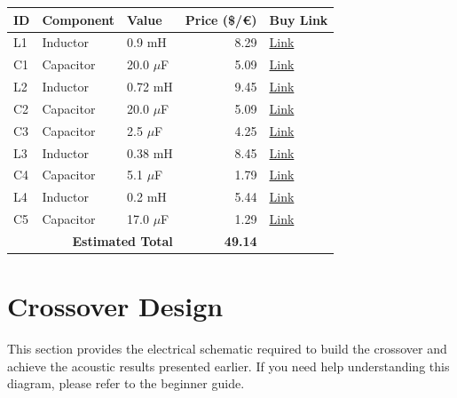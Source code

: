\documentclass[11pt,a4paper]{report}
\begin{document}
\vspace{0.5cm}
\begin{table}[H]
    \centering
    \renewcommand{\arraystretch}{1.5}
    \begin{tabular}{@{}lllrl@{}}
        \toprule
        \textbf{ID} & \textbf{Component} & \textbf{Value} & \textbf{Price (\$/€)} & \textbf{Buy Link} \\
        \midrule
        L1 & Inductor & 0.9 mH & 8.29 & \href{https://www.parts-express.com/Dayton-Audio-LW18-90-0.90mH-18-AWG-Perfect-Layer-Inductor-257-824}{Link} \\
        C1 & Capacitor & 20.0 $\mu$F & 5.09 & \href{https://www.parts-express.com/Solen-20uF-400V-Polypropylene-Capacitor-027-582}{Link} \\
        L2 & Inductor & 0.72 mH & 9.45 & \href{https://www.soundimports.eu/en/jantzen-audio-000-5820.html}{Link} \\
        C2 & Capacitor & 20.0 $\mu$F & 5.09 & \href{https://www.parts-express.com/Solen-20uF-400V-Polypropylene-Capacitor-027-582}{Link} \\
        C3 & Capacitor & 2.5 $\mu$F & 4.25 & \href{https://www.soundimports.eu/en/audyn-q4-2-5-400.html}{Link} \\
        L3 & Inductor & 0.38 mH & 8.45 & \href{https://www.soundimports.eu/en/jantzen-audio-000-1837.html}{Link} \\
        C4 & Capacitor & 5.1 $\mu$F & 1.79 & \href{https://www.parts-express.com/Solen-5.1uF-400V-Polypropylene-Capacitor-027-554}{Link} \\
        L4 & Inductor & 0.2 mH & 5.44 & \href{https://www.soundimports.eu/en/dayton-audio-lw18-20.html}{Link} \\
        C5 & Capacitor & 17.0 $\mu$F & 1.29 & \href{https://www.parts-express.com/17uF-100V-Non-Polarized-Capacitor-027-346}{Link} \\
        \midrule
        \multicolumn{3}{r}{\textbf{Estimated Total}} & \textbf{49.14} & \\
        \bottomrule
    \end{tabular}
\end{table}


\chapter{Crossover Design}
This section provides the electrical schematic required to build the crossover and achieve the acoustic results presented earlier. If you need help understanding this diagram, please refer to the beginner guide.
\end{document}
